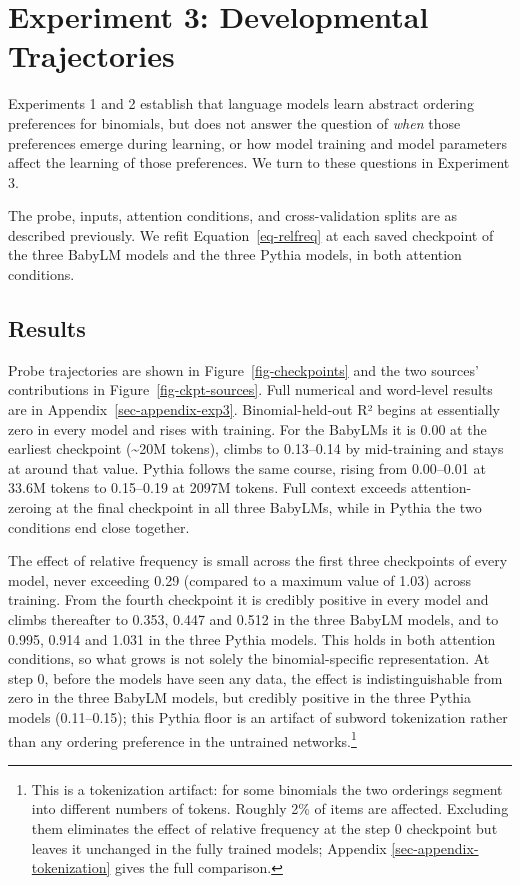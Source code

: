 \documentclass[11pt]{article}
\begin{document}
\section{Experiment 3: Developmental Trajectories}\label{sec-exp3}

Experiments 1 and 2 establish that language models learn abstract
ordering preferences for binomials, but does not answer the question of
\emph{when} those preferences emerge during learning, or how model
training and model parameters affect the learning of those preferences.
We turn to these questions in Experiment 3.

The probe, inputs, attention conditions, and cross-validation splits are
as described previously. We refit Equation~\ref{eq-relfreq} at each
saved checkpoint of the three BabyLM models and the three Pythia models,
in both attention conditions.

\subsection{Results}\label{results-2}

Probe trajectories are shown in Figure~\ref{fig-checkpoints} and the two
sources' contributions in Figure~\ref{fig-ckpt-sources}. Full numerical
and word-level results are in Appendix~\ref{sec-appendix-exp3}.
Binomial-held-out R² begins at essentially zero in every model and rises
with training. For the BabyLMs it is 0.00 at the earliest checkpoint
(\textasciitilde20M tokens), climbs to 0.13--0.14 by mid-training and
stays at around that value. Pythia follows the same course, rising from
0.00--0.01 at 33.6M tokens to 0.15--0.19 at 2097M tokens. Full context
exceeds attention-zeroing at the final checkpoint in all three BabyLMs,
while in Pythia the two conditions end close together.

The effect of relative frequency is small across the first three
checkpoints of every model, never exceeding 0.29 (compared to a maximum
value of 1.03) across training. From the fourth checkpoint it is
credibly positive in every model and climbs thereafter to 0.353, 0.447
and 0.512 in the three BabyLM models, and to 0.995, 0.914 and 1.031 in
the three Pythia models. This holds in both attention conditions, so
what grows is not solely the binomial-specific representation. At step
0, before the models have seen any data, the effect is indistinguishable
from zero in the three BabyLM models, but credibly positive in the three
Pythia models (0.11--0.15); this Pythia floor is an artifact of subword
tokenization rather than any ordering preference in the untrained
networks.\footnote{This is a tokenization artifact: for some binomials
  the two orderings segment into different numbers of tokens. Roughly
  2\% of items are affected. Excluding them eliminates the effect of
  relative frequency at the step 0 checkpoint but leaves it unchanged in
  the fully trained models; Appendix \ref{sec-appendix-tokenization}
  gives the full comparison.}
\end{document}
